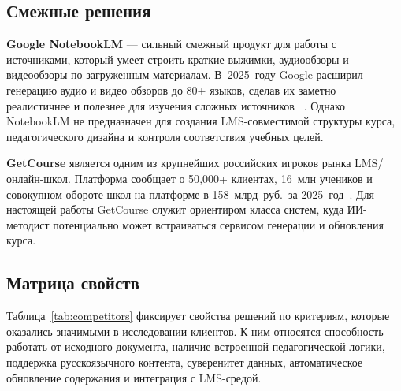 \subsection{Смежные решения}

\textbf{Google NotebookLM} — сильный смежный продукт для работы
с источниками, который умеет строить краткие выжимки, аудиообзоры
и видеообзоры по загруженным материалам. В~2025~году Google
расширил генерацию аудио и видео обзоров до 80+ языков, сделав
их заметно реалистичнее и полезнее для изучения сложных источников
~\cite{notebooklm_audio_2025}. Однако NotebookLM не предназначен
для создания LMS-совместимой структуры курса, педагогического
дизайна и контроля соответствия учебных целей.

\textbf{GetCourse} является одним из крупнейших российских игроков
рынка LMS/онлайн-школ. Платформа сообщает о 50{,}000+ клиентах,
16~млн учеников и совокупном обороте школ на платформе в
158~млрд~руб.\ за 2025~год~\cite{getcourse_platform_2026}.
Для настоящей работы GetCourse служит ориентиром класса систем, куда
ИИ-методист потенциально может встраиваться сервисом генерации и обновления курса.

\subsection{Матрица свойств}

Таблица~\ref{tab:competitors} фиксирует свойства решений по критериям,
которые оказались значимыми в исследовании клиентов. К ним относятся
способность работать от исходного документа, наличие встроенной педагогической логики,
поддержка русскоязычного контента, суверенитет данных, автоматическое
обновление содержания и интеграция с LMS-средой.

